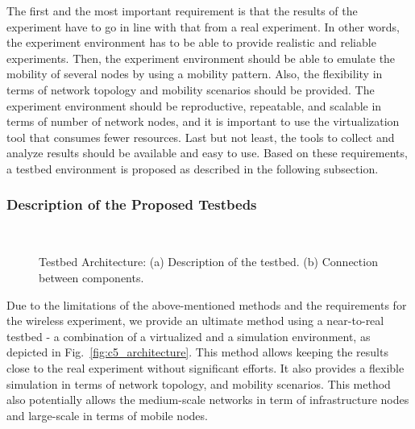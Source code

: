 The first and the most important requirement is that the results of the experiment have to go in line with that from a real experiment. In other words, the experiment environment has to be able to provide realistic and reliable experiments. Then, the experiment environment should be able to emulate the mobility of several nodes by using a mobility pattern. Also, the flexibility in terms of network topology and mobility scenarios should be provided. The experiment environment should be reproductive, repeatable, and scalable in terms of number of network nodes, and it is important to use the virtualization tool that consumes fewer resources. Last but not least, the tools to collect and analyze results should be available and easy to use. Based on these requirements, a testbed environment is proposed as described in the following subsection. 

\subsubsection{Description of the Proposed Testbeds}

\begin{figure}
\centering
{}\,\,\,\,\,\,
\caption[Architecture of the near-to-real testbed.]{Testbed Architecture: (a) Description of the testbed. (b) Connection between components.}
\label{scenariocbf}
\end{figure}

Due to the limitations of the above-mentioned methods and the requirements for the wireless experiment, we provide an ultimate method using a near-to-real testbed - a combination of a virtualized and a simulation environment, as depicted in Fig.~\ref{fig:c5_architecture}. This method allows keeping the results close to the real experiment without significant efforts. It also provides a flexible simulation in terms of network topology, and mobility scenarios. This method also potentially allows the medium-scale networks in term of infrastructure nodes and large-scale in terms of mobile nodes.

